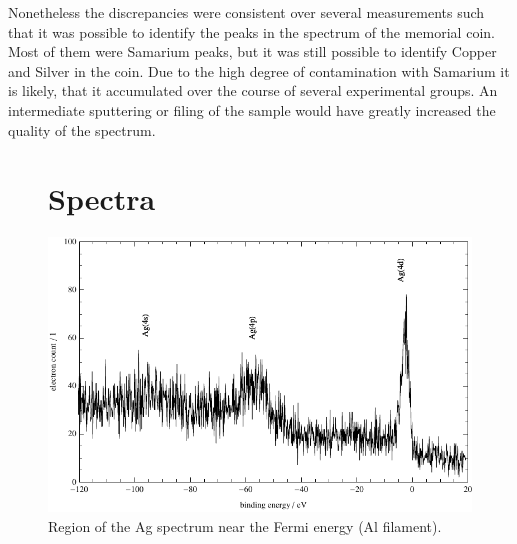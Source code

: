 \documentclass[a4paper]{scrartcl}
\numberwithin{equation}{section}
\numberwithin{figure}{section}
\numberwithin{table}{section}
\begin{document}
Nonetheless the discrepancies were consistent over several measurements such that it was possible to identify the peaks in the spectrum of the memorial coin. Most of them were Samarium peaks, but it was still possible to identify Copper and Silver in the coin. Due to the high degree of contamination with Samarium it is likely, that it accumulated over the course of several experimental groups. An intermediate sputtering or filing of the sample would have greatly increased the quality of the spectrum.





\clearpage
\begin{figure}
\section{Spectra}
  \centering
   	\includegraphics[width=\linewidth]{img/AgAlFermi.pdf}
 \caption{\small Region of the Ag spectrum near the Fermi energy (Al filament).}
        \label{fig:agfermi}
\end{figure}
\end{document}
